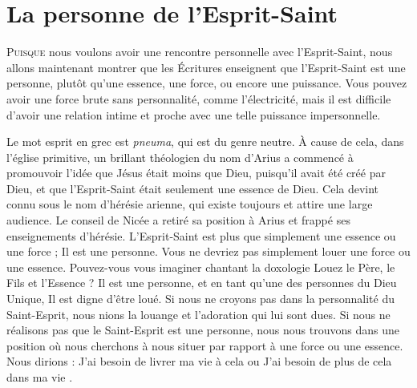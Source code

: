\chapter{La personne de l'Esprit-Saint}

\lettrine[lines=3]{P}{uisque} nous voulons avoir une rencontre personnelle avec l'Esprit-Saint, nous allons maintenant montrer que les Écritures enseignent que l'Esprit-Saint est une personne, plutôt qu'une essence, une force, ou encore une puissance. Vous pouvez avoir une force brute sans personnalité, comme l'électricité, mais il est difficile d'avoir une relation intime et proche avec une telle puissance impersonnelle.

Le mot \og esprit \fg{} en grec est \emph{pneuma}, qui est du genre neutre. À cause de cela, dans l'église primitive, un brillant théologien du nom d'Arius a commencé à promouvoir l'idée que Jésus était moins que Dieu, puisqu'il avait été créé par Dieu, et que l'Esprit-Saint était seulement une \og essence \fg{} de Dieu. Cela devint connu sous le nom d'hérésie arienne, qui existe toujours et attire une large audience. Le conseil de Nicée a retiré sa position à Arius et frappé ses enseignements d'hérésie. L'Esprit-Saint est plus que simplement une essence ou une force ; Il est une personne. Vous ne devriez pas simplement louer une force ou une essence. Pouvez-vous vous imaginer chantant la doxologie \og Louez le Père, le Fils et l'Essence \fg{} ? Il est une personne, et en tant qu'une des personnes du Dieu Unique, Il est digne d'être loué. Si nous ne croyons pas dans la personnalité du Saint-Esprit, nous nions la louange et l'adoration qui lui sont dues. Si nous ne réalisons pas que le Saint-Esprit est une personne, nous nous trouvons dans une position où nous cherchons à nous situer par rapport à une force ou une essence. Nous dirions : \og J'ai besoin de livrer ma vie à cela \fg{} ou \og J'ai besoin de plus de cela dans ma vie .\fg



